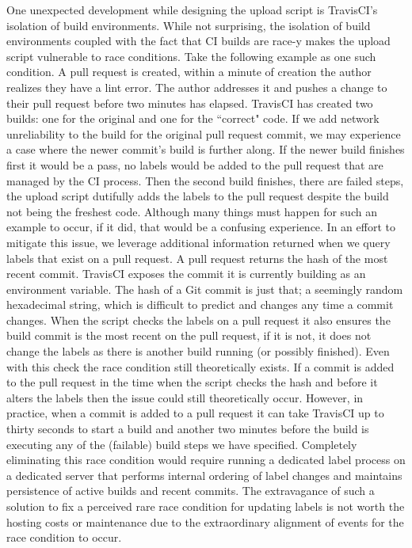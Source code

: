 {{{{{One unexpected development while designing the upload script is TravisCI's isolation of build environments. While not surprising, the isolation of build environments coupled with the fact that CI builds are race-y makes the upload script vulnerable to race conditions. Take the following example as one such condition. A pull request is created, within a minute of creation the author realizes they have a lint error. The author addresses it and pushes a change to their pull request before two minutes has elapsed. TravisCI has created two builds: one for the original and one for the ``correct" code. If we add network unreliability to the build for the original pull request commit, we may experience a case where the newer commit's build is further along. If the newer build finishes first it would be a pass, no labels would be added to the pull request that are managed by the CI process. Then the second build finishes, there are failed steps, the upload script dutifully adds the labels to the pull request despite the build not being the freshest code. Although many things must happen for such an example to occur, if it did, that would be a confusing experience. In an effort to mitigate this issue, we leverage additional information returned when we query labels that exist on a pull request. A pull request returns the hash of the most recent commit. TravisCI exposes the commit it is currently building as an environment variable. The hash of a Git commit is just that; a seemingly random hexadecimal string, which is difficult to predict and changes any time a commit changes. When the script checks the labels on a pull request it also ensures the build commit is the most recent on the pull request, if it is not, it does not change the labels as there is another build running (or possibly finished). Even with this check the race condition still theoretically exists. If a commit is added to the pull request in the time when the script checks the hash and before it alters the labels then the issue could still theoretically occur. However, in practice, when a commit is added to a pull request it can take TravisCI up to thirty seconds to start a build and another two minutes before the build is executing any of the (failable) build steps we have specified. Completely eliminating this race condition would require running a dedicated label process on a dedicated server that performs internal ordering of label changes and maintains persistence of active builds and recent commits. The extravagance of such a solution to fix a perceived rare race condition for updating labels is not worth the hosting costs or maintenance due to the extraordinary alignment of events for the race condition to occur.

}}}}}
